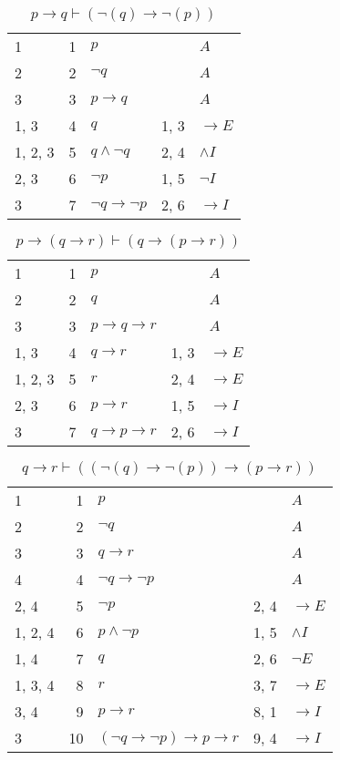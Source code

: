 \documentclass{article}
\begin{document}
\begin{table}[htbp]
\end{table}\begin{table}[htbp]\caption*{$p→q ⊢ (¬(q)→ ¬(p))$}\centering\begin{tabular}{lrlll}
{1} & 1 & $p$ & {} & $A$ \\
{2} & 2 & $¬q$ & {} & $A$ \\
{3} & 3 & $p→q$ & {} & $A$ \\
{1, 3} & 4 & $q$ & {1, 3} & $→E$ \\
{1, 2, 3} & 5 & $q∧ ¬q$ & {2, 4} & $∧I$ \\
{2, 3} & 6 & $¬p$ & {1, 5} & $¬I$ \\
{3} & 7 & $¬q→ ¬p$ & {2, 6} & $→I$ \\
\end{tabular}
\end{table}\begin{table}[htbp]\caption*{$p→(q→r) ⊢ (q→(p→r))$}\centering\begin{tabular}{lrlll}
{1} & 1 & $p$ & {} & $A$ \\
{2} & 2 & $q$ & {} & $A$ \\
{3} & 3 & $p→q→r$ & {} & $A$ \\
{1, 3} & 4 & $q→r$ & {1, 3} & $→E$ \\
{1, 2, 3} & 5 & $r$ & {2, 4} & $→E$ \\
{2, 3} & 6 & $p→r$ & {1, 5} & $→I$ \\
{3} & 7 & $q→p→r$ & {2, 6} & $→I$ \\
\end{tabular}
\end{table}\begin{table}[htbp]\caption*{$q→r ⊢ ((¬(q)→ ¬(p))→ (p→r))$}\centering\begin{tabular}{lrlll}
{1} & 1 & $p$ & {} & $A$ \\
{2} & 2 & $¬q$ & {} & $A$ \\
{3} & 3 & $q→r$ & {} & $A$ \\
{4} & 4 & $¬q→ ¬p$ & {} & $A$ \\
{2, 4} & 5 & $¬p$ & {2, 4} & $→E$ \\
{1, 2, 4} & 6 & $p∧ ¬p$ & {1, 5} & $∧I$ \\
{1, 4} & 7 & $q$ & {2, 6} & $¬E$ \\
{1, 3, 4} & 8 & $r$ & {3, 7} & $→E$ \\
{3, 4} & 9 & $p→r$ & {8, 1} & $→I$ \\
{3} & 10 & $(¬q→ ¬p)→p→r$ & {9, 4} & $→I$ \\
\end{tabular}

\end{table}
\end{document}
